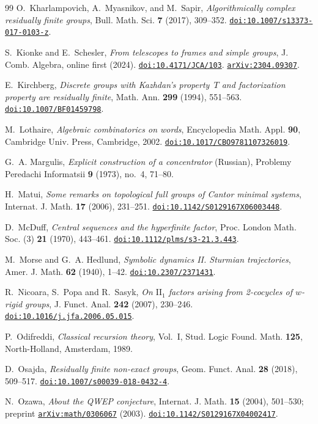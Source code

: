 \documentclass[11pt]{amsart}
\newcommand{\doi}[1]{\href{https://doi.org/#1}{\nolinkurl{doi:#1}}}
\newcommand{\arxiv}[1]{\href{https://arxiv.org/abs/#1}{\nolinkurl{arXiv:#1}}}
\begin{document}
\begin{thebibliography}{99}
O.~Kharlampovich, A.~Myasnikov, and M.~Sapir,
\emph{Algorithmically complex residually finite groups},
Bull. Math. Sci. \textbf{7} (2017), 309--352.
\doi{10.1007/s13373-017-0103-z}.

S.~Kionke and E.~Schesler,
\emph{From telescopes to frames and simple groups},
J. Comb. Algebra, online first (2024). \doi{10.4171/JCA/103}.
\arxiv{2304.09307}.

E.~Kirchberg, \emph{Discrete groups with Kazhdan's property~$T$ and
factorization property are residually finite},
Math. Ann. \textbf{299} (1994), 551--563.
\doi{10.1007/BF01459798}.

M.~Lothaire, \emph{Algebraic combinatorics on words}, Encyclopedia Math.
Appl. \textbf{90}, Cambridge Univ. Press, Cambridge, 2002.
\doi{10.1017/CBO9781107326019}.

G.~A. Margulis, \emph{Explicit construction of a concentrator}
(Russian), Problemy Peredachi Informatsii \textbf{9} (1973), no.~4,
71--80.

H.~Matui, \emph{Some remarks on topological full groups of Cantor
minimal systems}, Internat. J. Math. \textbf{17} (2006), 231--251.
\doi{10.1142/S0129167X06003448}.

D.~McDuff, \emph{Central sequences and the hyperfinite factor},
Proc. London Math. Soc. (3) \textbf{21} (1970), 443--461.
\doi{10.1112/plms/s3-21.3.443}.

M.~Morse and G.~A. Hedlund,
\emph{Symbolic dynamics II. Sturmian trajectories},
Amer. J. Math. \textbf{62} (1940), 1--42.
\doi{10.2307/2371431}.

R.~Nicoara, S.~Popa and R.~Sasyk, \emph{On $\mathrm{II}_1$ factors
arising from 2-cocycles of $w$-rigid groups}, J. Funct. Anal.
\textbf{242} (2007), 230--246. \doi{10.1016/j.jfa.2006.05.015}.

P.~Odifreddi, \emph{Classical recursion theory}, Vol.~I, Stud. Logic
Found. Math. \textbf{125}, North-Holland, Amsterdam, 1989.

D.~Osajda, \emph{Residually finite non-exact groups}, Geom. Funct. Anal.
\textbf{28} (2018), 509--517. \doi{10.1007/s00039-018-0432-4}.

N.~Ozawa, \emph{About the QWEP conjecture},
Internat. J. Math. \textbf{15} (2004), 501--530; preprint \arxiv{math/0306067} (2003).
\doi{10.1142/S0129167X04002417}.


\end{thebibliography}
\end{document}
